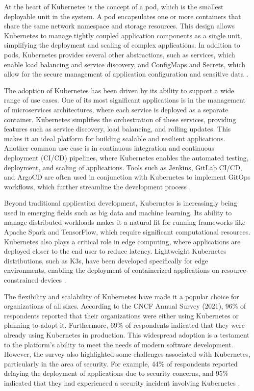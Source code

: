 At the heart of Kubernetes is the concept of a pod, which is the smallest deployable unit in the system. A pod encapsulates one or more containers that share the same network namespace and storage resources. This design allows Kubernetes to manage tightly coupled application components as a single unit, simplifying the deployment and scaling of complex applications. In addition to pods, Kubernetes provides several other abstractions, such as services, which enable load balancing and service discovery, and ConfigMaps and Secrets, which allow for the secure management of application configuration and sensitive data \citeyear{rahman2023}.

The adoption of Kubernetes has been driven by its ability to support a wide range of use cases. One of its most significant applications is in the management of microservices architectures, where each service is deployed as a separate container. Kubernetes simplifies the orchestration of these services, providing features such as service discovery, load balancing, and rolling updates. This makes it an ideal platform for building scalable and resilient applications. Another common use case is in continuous integration and continuous deployment (CI/CD) pipelines, where Kubernetes enables the automated testing, deployment, and scaling of applications. Tools such as Jenkins, GitLab CI/CD, and ArgoCD are often used in conjunction with Kubernetes to implement GitOps workflows, which further streamline the development process \citeyear{cncf2021}.

Beyond traditional application development, Kubernetes is increasingly being used in emerging fields such as big data and machine learning. Its ability to manage distributed workloads makes it a natural fit for running frameworks like Apache Spark and TensorFlow, which require significant computational resources. Kubernetes also plays a critical role in edge computing, where applications are deployed closer to the end user to reduce latency. Lightweight Kubernetes distributions, such as K3s, have been developed specifically for edge environments, enabling the deployment of containerized applications on resource-constrained devices \citeyear{deng2023}.

The flexibility and scalability of Kubernetes have made it a popular choice for organizations of all sizes. According to the CNCF Annual Survey (2021), 96\% of respondents reported that their organizations were either using Kubernetes or planning to adopt it. Furthermore, 69\% of respondents indicated that they were already using Kubernetes in production. This widespread adoption is a testament to the platform’s ability to meet the needs of modern software development. However, the survey also highlighted some challenges associated with Kubernetes, particularly in the area of security. For example, 44\% of respondents reported delaying the deployment of applications due to security concerns, and 95\% indicated that they had experienced a security incident involving Kubernetes \citeyear{cncf2021}.

